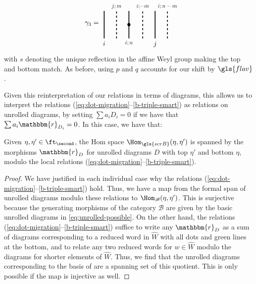 \begin{equation*}
\quad
\gamma_3= \begin{tikzpicture}[very thick,scale=.7,baseline,xscale=.9]       \draw (0,0)
      +(1,-1) -- +(1,1) node[below,at start,scale=.8]{$i;n$};  \draw (0,0)
      +(-1,-1) -- +(-1,1) node[below,at start]{$i$}; \draw[dashed] (0,0)
      +(0,-1) -- node[above, at end,scale=.8]{$j;m$}+(0,1);       \fill (1,0) circle (3.5pt);
    \end{tikzpicture}\begin{tikzpicture}[very
      thick,scale=.7,baseline,xscale=.9]  \draw[dashed] (1,0) +(1,-1) -- +(1,1)
      node[above,at end,scale=.8]{$i;n-m$}; \draw[dashed] (1,0) +(-1,-1) --+(-1,1)
      node[above,at end,scale=.8]{$i;\!-m$}; \draw (1,0) +(0,-1) -- node[below, at start]{$j$}+(0,1); 
    \end{tikzpicture}
  \end{equation*}
  with $s$ denoting the unique reflection in the affine Weyl group
  making the top and bottom match.  As before, using $p$ and $q$
  accounts for our shift by $\gls{flav}$.

  Given this reinterpretation of our relations in terms of diagrams, this allows us to interpret the relations (\ref{eq:dot-migration}--\ref{b-triple-smart}) as relations on unrolled diagrams, by setting $\sum a_iD_i=0$ if we have that $\sum a_i\mathbbm{r}_{D_i}=0$.
  In this case, we have that:
  \begin{lemma}\label{lem:unrolled-B}
    Given $\eta,\eta'\in \ft_{\second}$, the Hom space
    $\Hom_{\gls{scrB}}(\eta,\eta')$ is spanned by the morphisms
    $\mathbbm{r}_D$ for unrolled diagrams $D$ with top $\eta'$ and
    bottom $\eta$, modulo the local relations (\ref{eq:dot-migration}--\ref{b-triple-smart}).
  \end{lemma}
  \begin{proof}
    We have justified in each individual case why the relations
    (\ref{eq:dot-migration}--\ref{b-triple-smart}) hold.  Thus, we have a
    map from the formal span of unrolled diagrams modulo these
    relations to $\Hom_{\mathscr{B}}(\eta,\eta')$.  This is surjective
    because the generating morphisms of the category $\mathscr{B}$ are
    given by the basic unrolled diagrams in
    \eqref{eq:unrolled-possible}.  On the other hand, the relations
    (\ref{eq:dot-migration}--\ref{b-triple-smart}) suffice to write any
     $\mathbbm{r}_D$ as a sum of diagrams corresponding to a reduced word in
    $\widehat{W}$ with all dots and green lines at the bottom, and to
    relate any two reduced words for $w\in \widehat{W}$ modulo the
    diagrams for shorter elements of $\widehat{W}$.  Thus, we find
    that the unrolled diagrams corresponding to the basis of
    \cite[Cor. 3.12]{WebSD} are a spanning set of this quotient.  This
    is only possible if the map is injective as well.
  \end{proof}
  

